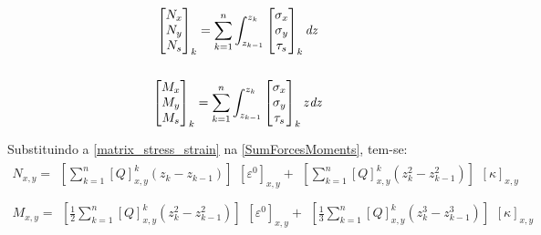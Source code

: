 \begin{equation} \label{SumForcesMoments}
\begin{gathered}
\begin{bmatrix}
    N_{x} \\
    N_{y} \\
    N_{s} \\
\end{bmatrix}_k
= \sum^n_{k=1} \int^{z_k}_{z_{k-1}}
\begin{bmatrix}
    \sigma_{x} \\
    \sigma_{y} \\
    \tau_{s} \\
\end{bmatrix}_k
\emph{dz} \\~\\
\begin{bmatrix}
    M_{x} \\
    M_{y} \\
    M_{s} \\
\end{bmatrix}_k
= \sum^n_{k=1} \int^{z_k}_{z_{k-1}}
\begin{bmatrix}
    \sigma_{x} \\
    \sigma_{y} \\
    \tau_{s} \\
\end{bmatrix}_k
z\emph{dz}
\end{gathered}
\end{equation}

Substituindo a \autoref{matrix_stress_strain} na \autoref{SumForcesMoments}, tem-se:
\begin{equation} \label{SumForcesMoments_general}
\begin{gathered}
N_{x,y} =
\begin{matrix}
[\sum^n_{k=1}[Q]^k_{x,y}({z_k} -{z_{k-1}})]
\end{matrix}
[\varepsilon^0]_{x,y} +
\begin{matrix}
[\sum^n_{k=1}[Q]^k_{x,y}({z^2_k} -{z^2_{k-1}})]
\end{matrix}
[\kappa]_{x,y}\\~\\
M_{x,y} =
\begin{matrix}
[\frac{1}{2}\sum^n_{k=1}[Q]^k_{x,y}({z^2_k} -{z^2_{k-1}})]
\end{matrix}
[\varepsilon^0]_{x,y} +
\begin{matrix}
[\frac{1}{3}\sum^n_{k=1}[Q]^k_{x,y}({z^3_k} -{z^3_{k-1}})]
\end{matrix}
[\kappa]_{x,y}
\end{gathered}
\end{equation}

